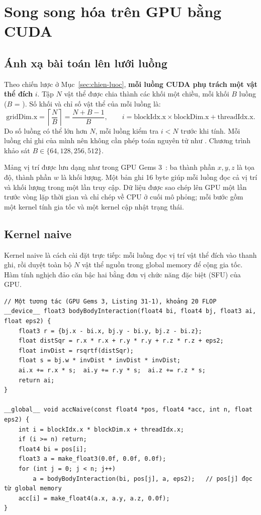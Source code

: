 \section{Song song hóa trên GPU bằng CUDA}
\label{sec:cai-dat-cuda}

\subsection{Ánh xạ bài toán lên lưới luồng}

Theo chiến lược ở Mục~\ref{sec:chien-luoc}, \textbf{mỗi luồng CUDA phụ trách một vật thể đích} $i$. Tập $N$ vật thể được chia thành các khối một chiều, mỗi khối $B$ luồng ($B$ = ). Số khối và chỉ số vật thể của mỗi luồng là:
\begin{equation}
\text{gridDim.x} = \left\lceil \frac{N}{B} \right\rceil = \frac{N+B-1}{B}, \qquad
i = \text{blockIdx.x} \times \text{blockDim.x} + \text{threadIdx.x}.
\end{equation}
Do số luồng có thể lớn hơn $N$, mỗi luồng kiểm tra $i<N$ trước khi tính. Mỗi luồng chỉ ghi  của mình nên không cần phép toán nguyên tử như . Chương trình khảo sát $B \in \{64, 128, 256, 512\}$.

Mảng vị trí được lưu dạng  như trong GPU Gems 3~\cite{gpugems3}: ba thành phần $x,y,z$ là tọa độ, thành phần $w$ là khối lượng. Một bản ghi 16 byte giúp mỗi luồng đọc cả vị trí và khối lượng trong một lần truy cập. Dữ liệu được sao chép lên GPU một lần trước vòng lặp thời gian và chỉ chép về CPU ở cuối mô phỏng; mỗi bước gồm một kernel tính gia tốc và một kernel cập nhật trạng thái.

\subsection{Kernel naive}

Kernel naive là cách cài đặt trực tiếp: mỗi luồng đọc vị trí vật thể đích vào thanh ghi, rồi duyệt toàn bộ $N$ vật thể nguồn trong global memory để cộng gia tốc. Hàm  tính nghịch đảo căn bậc hai bằng đơn vị chức năng đặc biệt (SFU) của GPU.

\begin{lstlisting}[language=CUDA]
// Một tương tác (GPU Gems 3, Listing 31-1), khoảng 20 FLOP
__device__ float3 bodyBodyInteraction(float4 bi, float4 bj, float3 ai, float eps2) {
    float3 r = {bj.x - bi.x, bj.y - bi.y, bj.z - bi.z};
    float distSqr = r.x * r.x + r.y * r.y + r.z * r.z + eps2;
    float invDist = rsqrtf(distSqr);
    float s = bj.w * invDist * invDist * invDist;
    ai.x += r.x * s;  ai.y += r.y * s;  ai.z += r.z * s;
    return ai;
}

__global__ void accNaive(const float4 *pos, float4 *acc, int n, float eps2) {
    int i = blockIdx.x * blockDim.x + threadIdx.x;
    if (i >= n) return;
    float4 bi = pos[i];
    float3 a = make_float3(0.0f, 0.0f, 0.0f);
    for (int j = 0; j < n; j++)
        a = bodyBodyInteraction(bi, pos[j], a, eps2);   // pos[j] đọc từ global memory
    acc[i] = make_float4(a.x, a.y, a.z, 0.0f);
}
\end{lstlisting}

